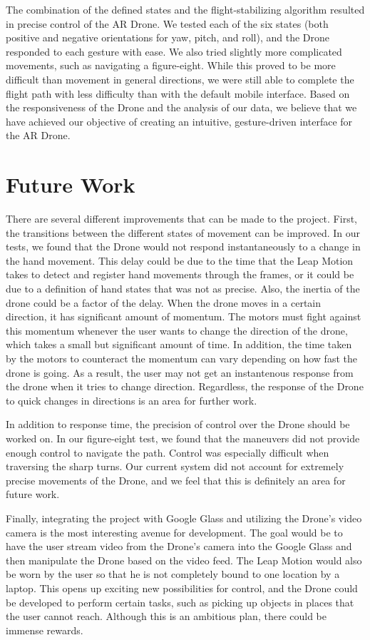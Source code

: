 \documentclass[letterpaper,english, 12pt]{article}
\begin{document}
The combination of the defined states and the flight-stabilizing algorithm resulted in precise control of the AR Drone. We tested each of the six states (both positive and negative orientations for yaw, pitch, and roll), and the Drone responded to each gesture with ease. We also tried slightly more complicated movements, such as navigating a figure-eight. While this proved to be more difficult than movement in general directions, we were still able to complete the flight path with less difficulty than with the default mobile interface. Based on the responsiveness of the Drone and the analysis of our data, we believe that we have achieved our objective of creating an intuitive, gesture-driven interface for the AR Drone.

\section*{Future Work}

There are several different improvements that can be made to the project. First, the transitions between the different states of movement can be improved. In our tests, we found that the Drone would not respond instantaneously to a change in the hand movement. This delay could be due to the time that the Leap Motion takes to detect and register hand movements through the frames, or it could be due to a definition of hand states that was not as precise. Also, the inertia of the drone could be a factor of the delay. When the drone moves in a certain direction, it has significant amount of momentum. The motors must fight against this momentum whenever the user wants to change the direction of the drone, which takes a small but significant amount of time. In addition, the time taken by the motors to counteract the momentum can vary depending on how fast the drone is going. As a result, the user may not get an instantenous response from the drone when it tries to change direction. Regardless, the response of the Drone to quick changes in directions is an area for further work.
	
In addition to response time, the precision of control over the Drone should be worked on. In our figure-eight test, we found that the maneuvers did not provide enough control to navigate the path. Control was especially difficult when traversing the sharp turns. Our current system did not account for extremely precise movements of the Drone, and we feel that this is definitely an area for future work.
	
Finally, integrating the project with Google Glass and utilizing the Drone's video camera is the most interesting avenue for development. The goal would be to have the user stream video from the Drone's camera into the Google Glass and then manipulate the Drone based on the video feed. The Leap Motion would also be worn by the user so that he is not completely bound to one location by a laptop. This opens up exciting new possibilities for control, and the Drone could be developed to perform certain tasks, such as picking up objects in places that the user cannot reach. Although this is an ambitious plan, there could be immense rewards.
\end{document}
